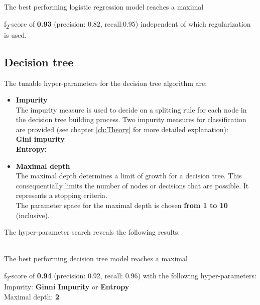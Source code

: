 {The best performing logistic regression model reaches a maximal {f\textsubscript{2}-score of \textbf{0.93} (precision:  0.82, recall:0.95) independent of which regularization is used.

\subsection*{Decision tree}
The tunable hyper-parameters for the decision tree algorithm are:
\begin{itemize}
\item{\textbf{Impurity}}\\
The impurity measure is used to decide on a splitting rule for each node in the decision tree building process.
Two impurity measures for classification are provided (see chapter \ref{ch:Theory} for more detailed explanation):\\
\textbf{Gini impurity} \\
\textbf{Entropy:}
\item{\textbf{Maximal depth}}\\
The maximal depth determines a limit of growth for a decision tree. This consequentially limits the number of nodes or decisions that are possible. It represents a stopping criteria. \\
The parameter space for the maximal depth is chosen \textbf{from 1 to 10} (inclusive). 
\end{itemize}

The hyper-parameter search reveals the following results: \\

\pgfplotsset{width=1.1\textwidth, height=0.5\textwidth}

\\
The best performing decision tree model reaches a maximal {f\textsubscript{2}-score of \textbf{0.94} (precision:  0.92, recall: 0.96) with the following hyper-parameters:\\
Impurity: \qquad  \qquad \textbf{Ginni Impurity} or \textbf{Entropy} \\
Maximal depth: \qquad \textbf{2}




}}}
